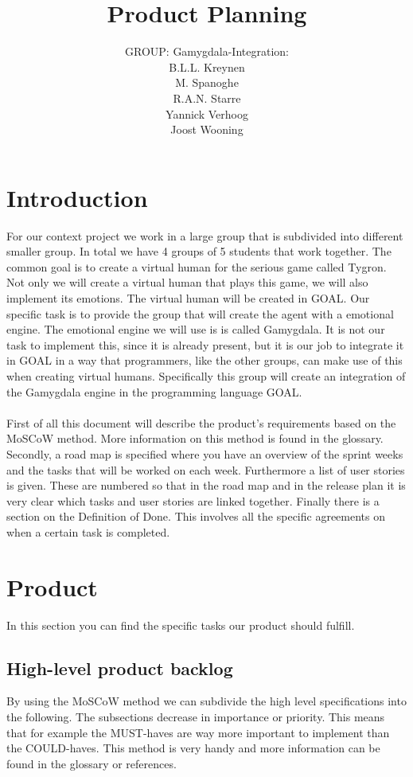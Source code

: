 \documentclass[]{article}
\title{Product Planning}
\author{GROUP: Gamygdala-Integration:\\
	B.L.L. Kreynen\\
	M. Spanoghe\\
	R.A.N. Starre\\
	Yannick Verhoog\\
	Joost Wooning\\
	}
\begin{document}
\maketitle
\pagebreak
\tableofcontents
\pagebreak
\section{Introduction}
For our context project we work in a large group that is subdivided into different smaller group. In total we have 4 groups of 5 students that work together. The common goal is to create a virtual human for the serious game called Tygron. Not only we will create a virtual human that plays this game, we will also implement its emotions. The virtual human will be created in GOAL. Our specific task is to provide the group that will create the agent with a emotional engine. The emotional engine we will use is is called Gamygdala. It is not our task to implement this, since it is already present, but it is our job to integrate it in GOAL in a way that programmers, like the other groups, can make use of this when creating virtual humans.
Specifically this group will create an integration of the \gls{Gamygdala} engine in the programming language \gls{GOAL}.\\
\\
First of all this document will describe the product's requirements based on the MoSCoW method. More information on this method is found in the glossary. Secondly, a road map is specified where you have an overview of the sprint weeks and the tasks that will be worked on each week. Furthermore a list of user stories is given. These are numbered so that in the road map and in the release plan it is very clear which tasks and user stories are linked together. Finally there is a section on the Definition of Done. This involves all the specific agreements on when a certain task is completed. 
\section{Product}
In this section you can find the specific tasks our product should fulfill.
\subsection{High-level product backlog}
By using the \gls{MoSCoW} method we can subdivide the high level specifications into the following. The subsections decrease in importance or priority. This means that for example the MUST-haves are way more important to implement than the COULD-haves. This method is very handy and more information can be found in the glossary or references.
\end{document}

